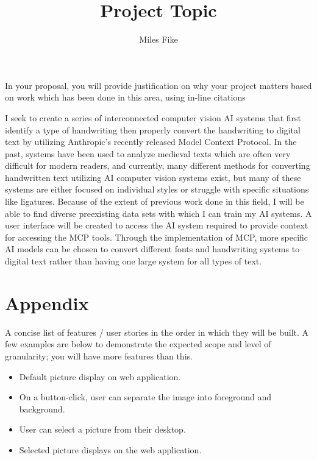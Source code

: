 \documentclass[12pt]{article}
\title{\textbf{Project Topic}}
\author{Miles Fike}
\begin{document}
\maketitle

In your proposal, you will provide justification on why your project matters based on work which has been done in this area, using in-line citations

I seek to create a series of interconnected computer vision AI systems that first identify a type of handwriting then properly convert the handwriting to digital text by utilizing Anthropic’s recently released Model Context Protocol. In the past, systems have been used to analyze medieval texts which are often very difficult for modern readers, and currently, many different methods for converting handwritten text utilizing AI computer vision systems exist, but many of these systems are either focused on individual styles or struggle with specific situations like ligatures. Because of the extent of previous work done in this field, I will be able to find diverse preexisting data sets with which I can train my AI systems. A user interface will be created to access the AI system required to provide context for accessing the MCP tools. Through the implementation of MCP, more specific AI models can be chosen to convert different fonts and handwriting systems to digital text rather than having one large system for all types of text.
\newpage
\section*{Appendix}
A concise list of features / user stories in the order in which they will be built. A few examples are below to demonstrate the expected scope and level of granularity; you will have more features than this.
\begin{itemize}
	\item Default picture display on web application.
	\item On a button-click, user can separate the image into foreground and background.
	\item User can select a picture from their desktop.
	\item Selected picture displays on the web application.
\end{itemize}




\end{document}
